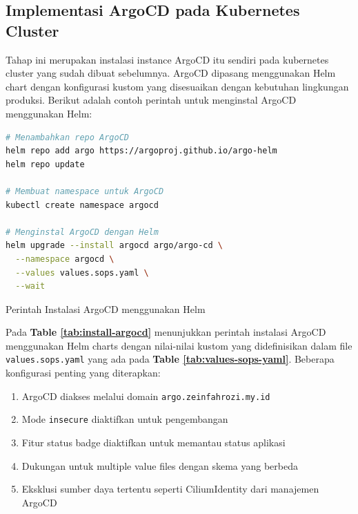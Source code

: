 \subsection{Implementasi ArgoCD pada Kubernetes Cluster}
Tahap ini merupakan instalasi instance ArgoCD itu sendiri pada kubernetes
cluster yang sudah dibuat sebelumnya. ArgoCD dipasang menggunakan Helm chart
dengan konfigurasi kustom yang disesuaikan dengan kebutuhan lingkungan
produksi. Berikut adalah contoh perintah untuk menginstal ArgoCD menggunakan
Helm:

\begin{table}[H]
  \centering
  \begin{minipage}{0.95\linewidth}
    \begin{lstlisting}[language=bash, basicstyle=\footnotesize\ttfamily]
# Menambahkan repo ArgoCD
helm repo add argo https://argoproj.github.io/argo-helm
helm repo update

# Membuat namespace untuk ArgoCD
kubectl create namespace argocd

# Menginstal ArgoCD dengan Helm
helm upgrade --install argocd argo/argo-cd \
  --namespace argocd \
  --values values.sops.yaml \
  --wait
    \end{lstlisting}
  \end{minipage}
  \caption{Perintah Instalasi ArgoCD menggunakan Helm}
  \label{tab:install-argocd}
\end{table}
Pada \textbf{Table \ref{tab:install-argocd}} menunjukkan perintah instalasi
ArgoCD menggunakan Helm charts dengan nilai-nilai kustom yang didefinisikan
dalam file \texttt{values.sops.yaml} yang ada pada \textbf{Table \ref{tab:values-sops-yaml}}. Beberapa konfigurasi penting yang diterapkan:

\begin{enumerate}[label=\alph*.]
  \item ArgoCD diakses melalui domain \texttt{argo.zeinfahrozi.my.id}
  \item Mode \texttt{insecure} diaktifkan untuk pengembangan
  \item Fitur status badge diaktifkan untuk memantau status aplikasi
  \item Dukungan untuk multiple value files dengan skema yang berbeda
  \item Eksklusi sumber daya tertentu seperti CiliumIdentity dari manajemen ArgoCD
\end{enumerate}

